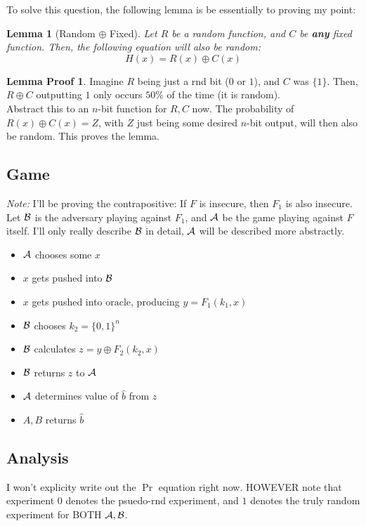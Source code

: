 \documentclass[12pt]{article}
\theoremstyle{plain}
\newtheorem{lemma}{Lemma}
\theoremstyle{definition}
\newtheorem*{lem_explanation}{Lemma Proof}
\begin{document}
\begin{solution}
To solve this question, the following lemma is be essentially to proving my point:

\begin{lemma}[Random $\oplus$ Fixed]\label{lemma:rnd-xor-fixed}
  Let $R$ be a random function, and $C$ be \textbf{any} fixed function. Then, the following equation will also be random:
  \begin{equation*}
    H(x) = R(x) \oplus C(x)
  \end{equation*}
\end{lemma}
\begin{lem_explanation}
  Imagine $R$ being just a rnd bit ($0$ or $1$), and $C$ was $\{1\}$. Then, $R \oplus C$ outputting $1$ only occurs $50\%$ of the time (it is random).\\
  \indent Abstract this to an $n$-bit function for $R, C$ now. The probability of $R(x) \oplus C(x) = Z$, with $Z$ just being some
  desired $n$-bit output, will then also be random. This proves the lemma.
\end{lem_explanation}

\subsection*{Game}
\textit{Note:} I'll be proving the contrapositive: If $F$ is insecure, then $F_1$ is also insecure.\\
\indent Let $\mathcal{B}$ is the adversary playing against $F_1$, and $\mathcal{A}$ be the game playing against $F$ itself. I'll only really describe $\mathcal{B}$ in detail, $\mathcal{A}$ will be described more abstractly.
\begin{itemize}
  \item[\textbf{A}] $\mathcal{A}$ chooses some $x$
  \item $x$ gets pushed into $\mathcal{B}$
  \item[\textbf{B}] $x$ gets pushed into $\text{oracle}$, producing $y = F_1(k_1, x)$
  \item $\mathcal{B}$ chooses $k_2 = \{0, 1\}^n$
  \item $\mathcal{B}$ calculates $z = y \oplus F_2(k_2, x)$
  \item $\mathcal{B}$ returns $z$ to $\mathcal{A}$
  \item[\textbf{A, B}] $\mathcal{A}$ determines value of $\hat{b}$ from $z$
  \item $A, B$ returns $\hat{b}$
\end{itemize}

\subsection*{Analysis}
I won't explicity write out the $\Pr$ equation right now. HOWEVER note that experiment $0$ denotes the psuedo-rnd experiment, and $1$ denotes the truly random experiment for BOTH $\mathcal{A}, \mathcal{B}$.


\end{solution}
\end{document}
